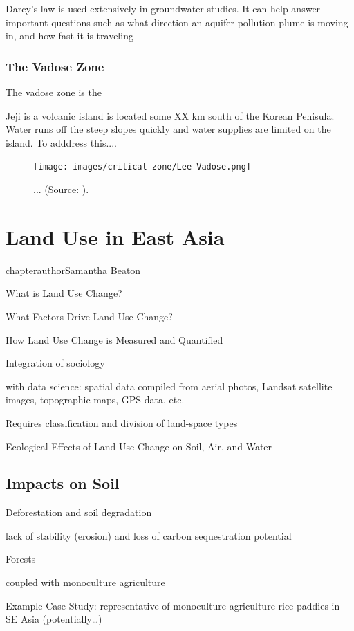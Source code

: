\documentclass{book}\usepackage{knitr}
\begin{document}
Darcy's law is used extensively in groundwater studies. It can help answer important questions such as what direction an aquifer pollution plume is moving in, and how fast it is traveling

\subsection{The Vadose Zone}

The vadose zone is the 

Jeji is a volcanic island is located some XX km south of the Korean Penisula. Water runs off the steep slopes quickly and water supplies are limited on the island. To adddress this...\citet{lee2017fifty}.

\begin{figure}
\texttt{[image: images/critical-zone/Lee-Vadose.png]}
\caption{... (Source: \citep{lee2017fifty}).}
\label{fig:vadose2}
\end{figure}



\chapter{Land Use in East Asia}

chapterauthor{Samantha Beaton}

What is Land Use Change?

What Factors Drive Land Use Change?

How Land Use Change is Measured and Quantified

Integration of sociology

with data science: spatial data compiled from aerial photos, Landsat satellite images, topographic maps, GPS data, etc.

Requires classification and division of land-space types

Ecological Effects of Land Use Change on Soil, Air, and Water

\section{Impacts on Soil}

Deforestation and soil degradation

lack of stability (erosion) and loss of carbon sequestration potential

Forests


coupled with monoculture agriculture

Example Case Study: representative of monoculture agriculture-rice paddies in SE Asia (potentially\ldots)
\end{document}
